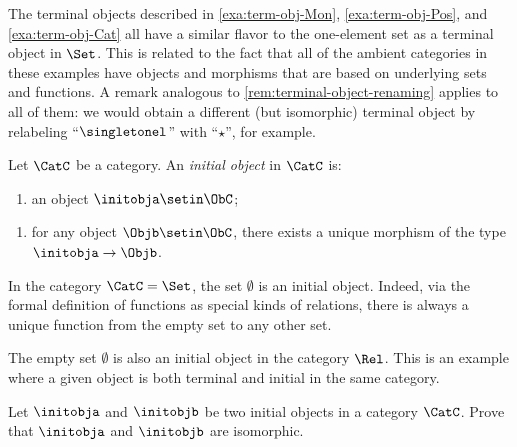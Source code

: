 \begin{remark}
The terminal objects described in \cref{exa:term-obj-Mon}, \cref{exa:term-obj-Pos}, and \cref{exa:term-obj-Cat} all have a similar flavor to the one-element set as a terminal object in $\Set$. This is related to the fact that all of the ambient categories in these examples have objects and morphisms that are based on underlying sets and functions. A remark analogous to \cref{rem:terminal-object-renaming} applies to all of them: we would obtain a different (but isomorphic) terminal object by relabeling ``$\singletonel$'' with ``$\star$'', for example. 
\end{remark}



\begin{ctdefinition}
Let $\CatC$ be a category. An \emph{initial object} in $\CatC$ is: 

\constit
\begin{enumerate}
\item an object $\initobja \setin \ObC$; 
\end{enumerate}
\condit
\begin{enumerate}
\item for any object $\Objb \setin \ObC$, there exists a unique morphism of the type $\initobja \to \Objb$. 
\end{enumerate}
\end{ctdefinition}

\begin{example}
In the category $\CatC = \Set$, the set $\emptyset$ is an initial object. Indeed, via the formal definition of functions as special kinds of relations, there is always a unique function from the empty set to any other set. 
\end{example}

\begin{example}\label{exa:init-obj-Rel}
The empty set $\emptyset$ is also an initial object in the category $\Rel$. This is an example where a given object is both terminal and initial in the same category. 
\end{example}



\begin{gradedexercise}
Let $\initobja$ and $\initobjb$ be two initial objects in a category $\CatC$.  Prove that $\initobja$ and $\initobjb$ are isomorphic.  
\end{gradedexercise}


